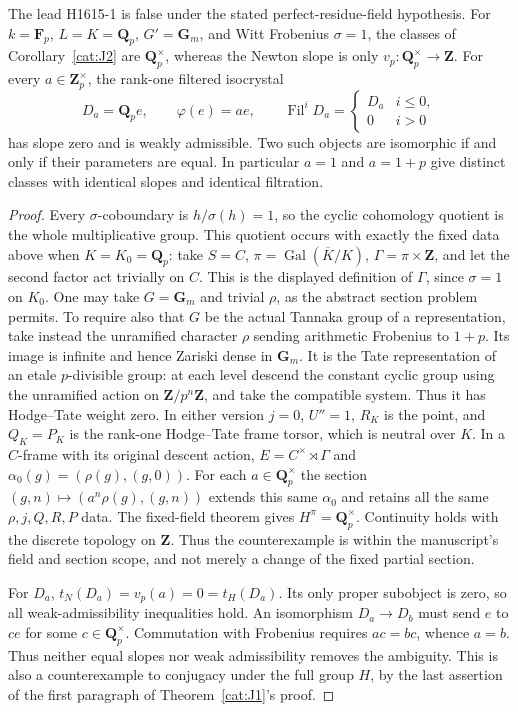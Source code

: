 \begin{proposition}\label{cat:J3}
The lead H1615-1 is false under the stated perfect-residue-field
hypothesis.  For $k=\mathbf F_p$, $L=K=\mathbf Q_p$, $G'=\mathbf G_m$,
and Witt Frobenius $\sigma=1$, the classes of
Corollary~\ref{cat:J2} are $\mathbf Q_p^\times$, whereas the Newton slope
is only $v_p:\mathbf Q_p^\times\to\mathbf Z$.
For every $a\in\mathbf Z_p^\times$, the rank-one filtered isocrystal
\[
 D_a=\mathbf Q_p e,\qquad \varphi(e)=a e,\qquad
 \operatorname{Fil}^iD_a=
 \begin{cases}D_a&i\leq0,\\0&i>0\end{cases}
\]
has slope zero and is weakly admissible.  Two such objects are
isomorphic if and only if their parameters are equal.  In particular
$a=1$ and $a=1+p$ give distinct classes with identical slopes and
identical filtration.
\end{proposition}
\begin{proof}
Every $\sigma$-coboundary is $h/\sigma(h)=1$, so the cyclic cohomology
quotient is the whole multiplicative group.  This quotient occurs with exactly the fixed data above when
$K=K_0=\mathbf Q_p$: take $S=C$, $\pi=\operatorname{Gal}(\overline K/K)$,
$\Gamma=\pi\times\mathbf Z$, and let the second factor act trivially
on $C$.  This is the displayed definition of $\Gamma$, since
$\sigma=1$ on $K_0$.  One may take $G=\mathbf G_m$ and trivial $\rho$, as the abstract
section problem permits.  To require also that $G$ be the actual
Tannaka group of a representation, take instead the unramified
character $\rho$ sending arithmetic Frobenius to $1+p$.
Its image is infinite and hence Zariski dense in $\mathbf G_m$.
It is the Tate representation of an etale $p$-divisible group: at
each level descend the constant cyclic group using the unramified
action on $\mathbf Z/p^n\mathbf Z$, and take the compatible system.
Thus it has Hodge--Tate weight zero.
In either version $j=0$, $U''=1$, $R_K$ is the point, and $Q_K=P_K$
is the rank-one Hodge--Tate frame torsor, which is neutral over $K$.
In a $C$-frame with its original descent action,
$E=C^\times\rtimes\Gamma$ and
$\alpha_0(g)=(\rho(g),(g,0))$.
For each $a\in\mathbf Q_p^\times$ the section
$(g,n)\mapsto(a^n\rho(g),(g,n))$ extends this same $\alpha_0$ and
retains all the same $\rho,j,Q,R,P$ data.
The fixed-field theorem gives $H^\pi=\mathbf Q_p^\times$.
Continuity holds with the discrete topology on $\mathbf Z$.
Thus the counterexample is within the manuscript's field and section
scope, and not merely a change of the fixed partial section.


For $D_a$, $t_N(D_a)=v_p(a)=0=t_H(D_a)$.  Its only proper subobject
is zero, so all weak-admissibility inequalities hold.  An isomorphism
$D_a\to D_b$ must send $e$ to $c e$ for some $c\in\mathbf Q_p^\times$.
Commutation with Frobenius requires $ac=bc$, whence $a=b$.
Thus neither equal slopes nor weak admissibility removes the ambiguity.
This is also a counterexample to conjugacy under the full group $H$,
by the last assertion of the first paragraph of
Theorem~\ref{cat:J1}'s proof.
\end{proof}


